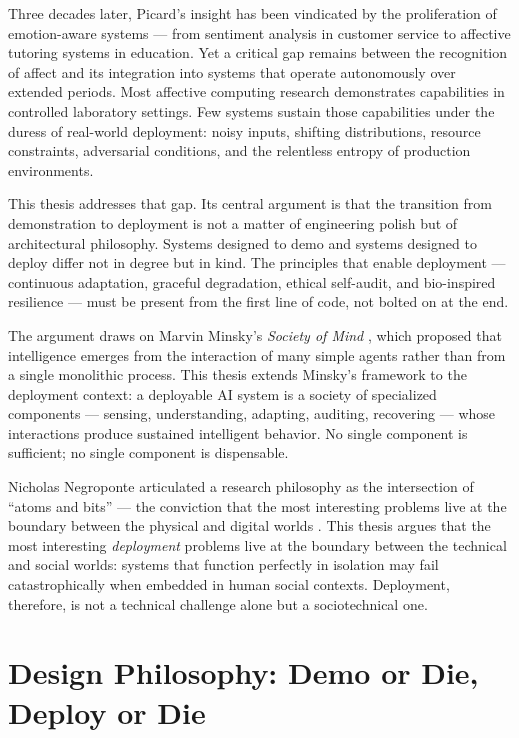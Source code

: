 \documentclass[11pt,a4paper]{article}
\begin{document}
Three decades later, Picard's insight has been vindicated by the proliferation of emotion-aware systems --- from sentiment analysis in customer service to affective tutoring systems in education. Yet a critical gap remains between the recognition of affect and its integration into systems that operate autonomously over extended periods. Most affective computing research demonstrates capabilities in controlled laboratory settings. Few systems sustain those capabilities under the duress of real-world deployment: noisy inputs, shifting distributions, resource constraints, adversarial conditions, and the relentless entropy of production environments.

This thesis addresses that gap. Its central argument is that the transition from demonstration to deployment is not a matter of engineering polish but of architectural philosophy. Systems designed to demo and systems designed to deploy differ not in degree but in kind. The principles that enable deployment --- continuous adaptation, graceful degradation, ethical self-audit, and bio-inspired resilience --- must be present from the first line of code, not bolted on at the end.

The argument draws on Marvin Minsky's \emph{Society of Mind} \citep{minsky1986}, which proposed that intelligence emerges from the interaction of many simple agents rather than from a single monolithic process. This thesis extends Minsky's framework to the deployment context: a deployable AI system is a society of specialized components --- sensing, understanding, adapting, auditing, recovering --- whose interactions produce sustained intelligent behavior. No single component is sufficient; no single component is dispensable.

Nicholas Negroponte articulated a research philosophy as the intersection of ``atoms and bits'' --- the conviction that the most interesting problems live at the boundary between the physical and digital worlds \citep{negroponte1995}. This thesis argues that the most interesting \emph{deployment} problems live at the boundary between the technical and social worlds: systems that function perfectly in isolation may fail catastrophically when embedded in human social contexts. Deployment, therefore, is not a technical challenge alone but a sociotechnical one.

\section{Design Philosophy: Demo or Die, Deploy or Die}
\end{document}
